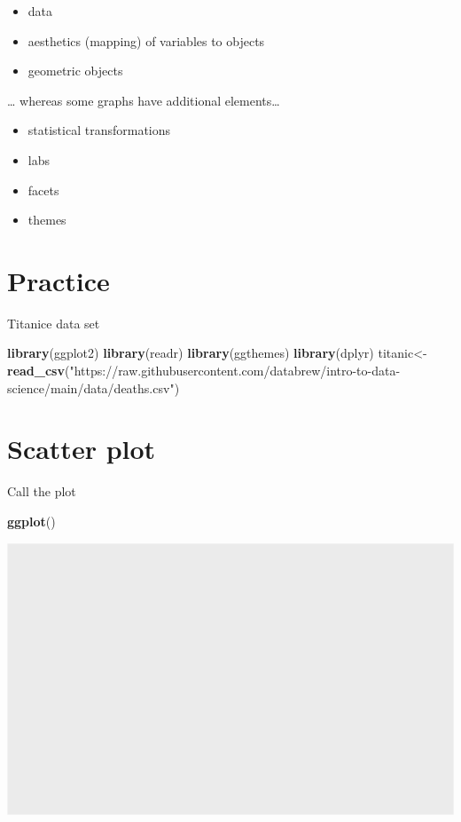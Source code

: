 \documentclass[
]{book}
\newenvironment{Shaded}{\begin{snugshade}}{\end{snugshade}}
\newcommand{\KeywordTok}[1]{\textcolor[rgb]{0.13,0.29,0.53}{\textbf{#1}}}
\newcommand{\NormalTok}[1]{#1}
\newcommand{\StringTok}[1]{\textcolor[rgb]{0.31,0.60,0.02}{#1}}
\providecommand{\tightlist}{%
  \setlength{\itemsep}{0pt}\setlength{\parskip}{0pt}}
\begin{document}
\begin{itemize}
\tightlist
\item
  data
\item
  aesthetics (mapping) of variables to objects
\item
  geometric objects
\end{itemize}

\ldots{} whereas some graphs have additional elements\ldots{}

\begin{itemize}
\tightlist
\item
  statistical transformations
\item
  labs
\item
  facets
\item
  themes
\end{itemize}

\hypertarget{practice}{%
\section*{Practice}\label{practice}}

Titanice data set

\begin{Shaded}
\begin{Highlighting}[]
\KeywordTok{library}\NormalTok{(ggplot2)}
\KeywordTok{library}\NormalTok{(readr)}
\KeywordTok{library}\NormalTok{(ggthemes)}
\KeywordTok{library}\NormalTok{(dplyr)}
\NormalTok{titanic<-}\StringTok{ }\KeywordTok{read_csv}\NormalTok{(}\StringTok{"https://raw.githubusercontent.com/databrew/intro-to-data-science/main/data/deaths.csv"}\NormalTok{)}
\end{Highlighting}
\end{Shaded}

\hypertarget{scatter-plot}{%
\section*{Scatter plot}\label{scatter-plot}}

Call the plot

\begin{Shaded}
\begin{Highlighting}[]
\KeywordTok{ggplot}\NormalTok{()}
\end{Highlighting}
\end{Shaded}

\includegraphics{figures/unnamed-chunk-134-1.pdf}
\end{document}

